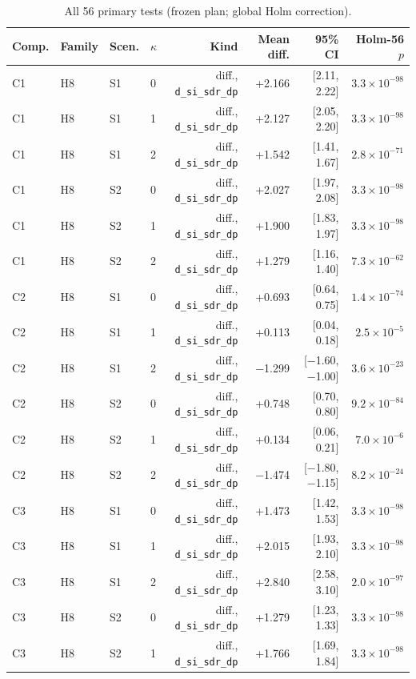 \begin{longtable}{@{}llllrrrr@{}}
\caption{All 56 primary tests (frozen plan; global Holm correction).}\label{tab:primary}\\
\toprule
Comp. & Family & Scen. & $\kappa$ & Kind & Mean diff. & 95\% CI & Holm-56 $p$ \\
\midrule\endhead
C1 & H8 & S1 & 0 & diff., \texttt{d\_si\_sdr\_dp} & +2.166 & [2.11, 2.22] & $3.3\times10^{-98}$ \\
C1 & H8 & S1 & 1 & diff., \texttt{d\_si\_sdr\_dp} & +2.127 & [2.05, 2.20] & $3.3\times10^{-98}$ \\
C1 & H8 & S1 & 2 & diff., \texttt{d\_si\_sdr\_dp} & +1.542 & [1.41, 1.67] & $2.8\times10^{-71}$ \\
C1 & H8 & S2 & 0 & diff., \texttt{d\_si\_sdr\_dp} & +2.027 & [1.97, 2.08] & $3.3\times10^{-98}$ \\
C1 & H8 & S2 & 1 & diff., \texttt{d\_si\_sdr\_dp} & +1.900 & [1.83, 1.97] & $3.3\times10^{-98}$ \\
C1 & H8 & S2 & 2 & diff., \texttt{d\_si\_sdr\_dp} & +1.279 & [1.16, 1.40] & $7.3\times10^{-62}$ \\
C2 & H8 & S1 & 0 & diff., \texttt{d\_si\_sdr\_dp} & +0.693 & [0.64, 0.75] & $1.4\times10^{-74}$ \\
C2 & H8 & S1 & 1 & diff., \texttt{d\_si\_sdr\_dp} & +0.113 & [0.04, 0.18] & $2.5\times10^{-5}$ \\
C2 & H8 & S1 & 2 & diff., \texttt{d\_si\_sdr\_dp} & $-$1.299 & [$-$1.60, $-$1.00] & $3.6\times10^{-23}$ \\
C2 & H8 & S2 & 0 & diff., \texttt{d\_si\_sdr\_dp} & +0.748 & [0.70, 0.80] & $9.2\times10^{-84}$ \\
C2 & H8 & S2 & 1 & diff., \texttt{d\_si\_sdr\_dp} & +0.134 & [0.06, 0.21] & $7.0\times10^{-6}$ \\
C2 & H8 & S2 & 2 & diff., \texttt{d\_si\_sdr\_dp} & $-$1.474 & [$-$1.80, $-$1.15] & $8.2\times10^{-24}$ \\
C3 & H8 & S1 & 0 & diff., \texttt{d\_si\_sdr\_dp} & +1.473 & [1.42, 1.53] & $3.3\times10^{-98}$ \\
C3 & H8 & S1 & 1 & diff., \texttt{d\_si\_sdr\_dp} & +2.015 & [1.93, 2.10] & $3.3\times10^{-98}$ \\
C3 & H8 & S1 & 2 & diff., \texttt{d\_si\_sdr\_dp} & +2.840 & [2.58, 3.10] & $2.0\times10^{-97}$ \\
C3 & H8 & S2 & 0 & diff., \texttt{d\_si\_sdr\_dp} & +1.279 & [1.23, 1.33] & $3.3\times10^{-98}$ \\
C3 & H8 & S2 & 1 & diff., \texttt{d\_si\_sdr\_dp} & +1.766 & [1.69, 1.84] & $3.3\times10^{-98}$ \\

\end{longtable}
